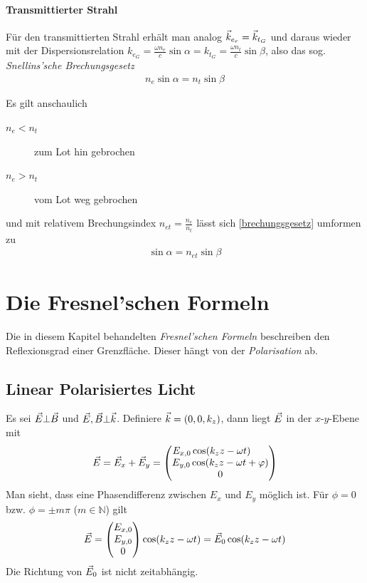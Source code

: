 \paragraph{Transmittierter Strahl} Für den transmittierten Strahl
erhält man analog $\vec{k}_{e_r} = \vec{k}_{t_G}$ und daraus wieder mit
der Dispersionsrelation
$k_{e_G} = \frac{\omega n_e}{c}\sin\alpha 
= k_{t_G} =  \frac{\omega n_t}{c}\sin\beta$, also das sog.
\emph{Snellins'sche  Brechungsgesetz}%
\begin{gather}
  n_e\sin\alpha = n_t\sin\beta
  \label{brechungsgesetz}
\end{gather}

Es gilt anschaulich
\begin{description}
\item[$n_e<n_t$] zum Lot hin gebrochen
\item[$n_e>n_t$] vom Lot weg gebrochen
\end{description}
und mit relativem Brechungsindex $n_{et}=\frac{n_e}{n_t}$ lässt sich
\eqref{brechungsgesetz} umformen zu
\begin{gather*}
  \sin\alpha = n_{et} \sin\beta
\end{gather*}


\section{Die Fresnel'schen Formeln}
Die in diesem Kapitel behandelten 
\emph{Fresnel'schen Formeln}
beschreiben den Reflexionsgrad einer Grenzfläche.
Dieser hängt von der \emph{Polarisation} ab.

\subsection{Linear Polarisiertes Licht}\label{4.3.1}%
Es sei $\vec{E}\bot\vec{B}$ und $\vec{E},\vec{B}\bot\vec{k}$.
Definiere $\vec{k}= (0,0,k_z)$, dann liegt $\vec{E}$ in der $x$-$y$-Ebene
mit
\begin{gather*}
  \vec{E} = \vec{E}_x + \vec{E}_y 
  =\begin{pmatrix}
    E_{x,0} \cos(k_z z - \omega t)\phantom{~+ \varphi}\\
    E_{y,0} \cos(k_z z - \omega t + \varphi)\\
    0
  \end{pmatrix}
\end{gather*}
Man sieht, dass eine Phasendifferenz zwischen $E_x$ und $E_y$
möglich ist. Für $\phi=0$ bzw. $\phi=\pm m\pi$ ($m\in\mathds{N}$) gilt
\begin{gather*}
  \vec{E} = \begin{pmatrix} E_{x,0}\\E_{y,0}\\0 \end{pmatrix}
  \cos(k_zz - \omega t)
  = \vec{E}_0  \cos(k_zz - \omega t)
\end{gather*}
Die Richtung von $\vec{E}_0$ ist nicht zeitabhängig.

